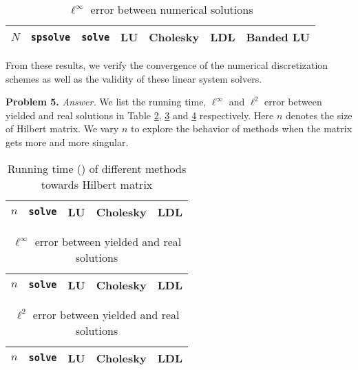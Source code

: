 \documentclass[english, nochinese]{pnote}
\begin{document}
\begin{table}[htb]
\centering
\small
\begin{tabular}{|c|c|c|c|c|c|c|}
\hline
$N$ & \verb"spsolve" & \verb"solve" & LU & Cholesky & LDL & Banded LU \\
\hline

\end{tabular}
\caption{$\ell^{\infty}$ error between numerical solutions}
\label{Tbl:NumNum}
\end{table}

From these results, we verify the convergence of the numerical discretization schemes as well as the validity of these linear system solvers.

\textbf{Problem 5.} \textit{Answer.} We list the running time, $\ell^{\infty}$ and $\ell^2$ error between yielded and real solutions in Table \ref{Tbl:Time}, \ref{Tbl:ErrInfty} and \ref{Tbl:Err2} respectively. Here $n$ denotes the size of Hilbert matrix. We vary $n$ to explore the behavior of methods when the matrix gets more and more singular.

\begin{table}[htb]
\centering
\begin{tabular}{|c|c|c|c|c|}
\hline
$n$ & \verb"solve" & LU & Cholesky & LDL \\
\hline

\end{tabular}
\caption{Running time () of different methods towards Hilbert matrix}
\label{Tbl:Time}
\end{table}

\begin{table}[htb]
\centering
\begin{tabular}{|c|c|c|c|c|}
\hline
$n$ & \verb"solve" & LU & Cholesky & LDL \\
\hline

\end{tabular}
\caption{$\ell^{\infty}$ error between yielded and real solutions}
\label{Tbl:ErrInfty}
\end{table}

\begin{table}[htb]
\centering
\begin{tabular}{|c|c|c|c|c|}
\hline
$n$ & \verb"solve" & LU & Cholesky & LDL \\
\hline

\end{tabular}
\caption{$\ell^2$ error between yielded and real solutions}
\label{Tbl:Err2}
\end{table}
\end{document}

